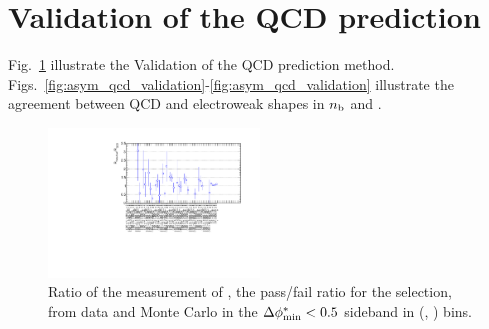 \clearpage
\section{Validation of the QCD prediction \label{app:qcdPredictionValidation}}

Fig.~\ref{fig:RR_qcd} illustrate the Validation of the QCD prediction method. Figs.~\ref{fig:asym_qcd_validation}-\ref{fig:asym_qcd_validation} illustrate the agreement between QCD and electroweak shapes in $n_{\text{b}}$ and \mht.

\begin{figure}[h!]
  \begin{center}        
    \includegraphics[width=0.5\textwidth]{figures/qcd/validation/RRPlot}
    \caption{ Ratio of the measurement of \rmhtmet, the pass/fail ratio for the \mhtmet selection, from data and Monte Carlo in the $\mbox{$\Delta\phi^{*}_{\rm min}$} < 0.5$ sideband in (\scalht, \njet) bins.  
    }

    \label{fig:RR_qcd}
  \end{center} 
\end{figure}


